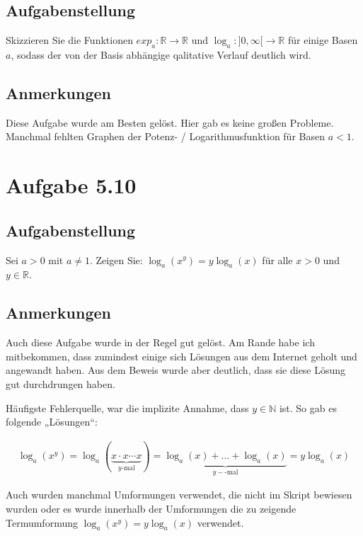 \documentclass[a4paper]{article}
\newcommand*{\R}{\mathbb R}
\newcommand*{\N}{\mathbb N}
\begin{document}
\subsection{Aufgabenstellung}

Skizzieren Sie die Funktionen $exp_a:\R\to\R$ und $\log_a:]0,\infty[\to\R$ für einige Basen $a$, sodass der von der Basis abhängige qalitative Verlauf deutlich wird.

\subsection{Anmerkungen}

Diese Aufgabe wurde am Besten gelöst. Hier gab es keine großen Probleme. Manchmal fehlten Graphen der Potenz- / Logarithmusfunktion für Basen $a<1$.

\section{Aufgabe 5.10}

\subsection{Aufgabenstellung}

Sei $a>0$ mit $a\neq 1$. Zeigen Sie: $\log_a(x^y)=y\log_a(x)$ für alle $x>0$ und $y\in\R$.

\subsection{Anmerkungen}

Auch diese Aufgabe wurde in der Regel gut gelöst. Am Rande habe ich mitbekommen, dass zumindest einige sich Lösungen aus dem Internet geholt und angewandt haben. Aus dem Beweis wurde aber deutlich, dass sie diese Lösung gut durchdrungen haben.

Häufigste Fehlerquelle, war die implizite Annahme, dass $y\in\N$ ist. So gab es folgende „Lösungen“:

\begin{align}
  \log_a\left(x^y\right) = \log_a\left(\underbrace{x\cdot x\cdots x}_{y\text{-mal}}\right) = \underbrace{\log_a(x)+\dots + \log_a(x)}_{y-\text{-mal}} = y \log_a(x)
\end{align}

Auch wurden manchmal Umformungen verwendet, die nicht im Skript bewiesen wurden oder es wurde innerhalb der Umformungen die zu zeigende Termumformung $\log_a(x^y)=y\log_a(x)$ verwendet.
\end{document}
